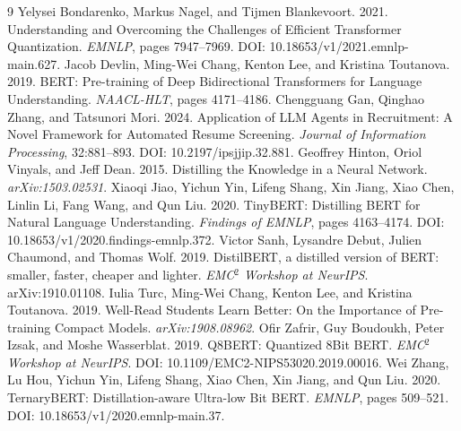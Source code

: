 \documentclass[11pt]{article}
\begin{document}
\begin{thebibliography}{9}
 Yelysei Bondarenko, Markus Nagel, and Tijmen Blankevoort. 2021. Understanding and Overcoming the Challenges of Efficient Transformer Quantization. \emph{EMNLP}, pages 7947--7969. DOI: 10.18653/v1/2021.emnlp-main.627.
 Jacob Devlin, Ming-Wei Chang, Kenton Lee, and Kristina Toutanova. 2019. BERT: Pre-training of Deep Bidirectional Transformers for Language Understanding. \emph{NAACL-HLT}, pages 4171--4186.
 Chengguang Gan, Qinghao Zhang, and Tatsunori Mori. 2024. Application of LLM Agents in Recruitment: A Novel Framework for Automated Resume Screening. \emph{Journal of Information Processing}, 32:881--893. DOI: 10.2197/ipsjjip.32.881.
 Geoffrey Hinton, Oriol Vinyals, and Jeff Dean. 2015. Distilling the Knowledge in a Neural Network. \emph{arXiv:1503.02531}.
 Xiaoqi Jiao, Yichun Yin, Lifeng Shang, Xin Jiang, Xiao Chen, Linlin Li, Fang Wang, and Qun Liu. 2020. TinyBERT: Distilling BERT for Natural Language Understanding. \emph{Findings of EMNLP}, pages 4163--4174. DOI: 10.18653/v1/2020.findings-emnlp.372.
 Victor Sanh, Lysandre Debut, Julien Chaumond, and Thomas Wolf. 2019. DistilBERT, a distilled version of BERT: smaller, faster, cheaper and lighter. \emph{EMC$^2$ Workshop at NeurIPS}. arXiv:1910.01108.
 Iulia Turc, Ming-Wei Chang, Kenton Lee, and Kristina Toutanova. 2019. Well-Read Students Learn Better: On the Importance of Pre-training Compact Models. \emph{arXiv:1908.08962}.
 Ofir Zafrir, Guy Boudoukh, Peter Izsak, and Moshe Wasserblat. 2019. Q8BERT: Quantized 8Bit BERT. \emph{EMC$^2$ Workshop at NeurIPS}. DOI: 10.1109/EMC2-NIPS53020.2019.00016.
 Wei Zhang, Lu Hou, Yichun Yin, Lifeng Shang, Xiao Chen, Xin Jiang, and Qun Liu. 2020. TernaryBERT: Distillation-aware Ultra-low Bit BERT. \emph{EMNLP}, pages 509--521. DOI: 10.18653/v1/2020.emnlp-main.37.
\end{thebibliography}
\end{document}
